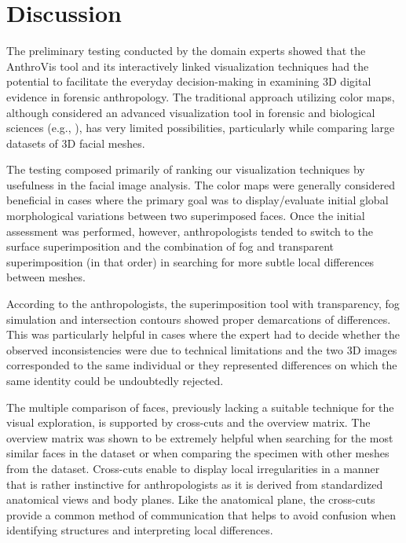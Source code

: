 \documentclass[final,5p,times]{elsarticle}
\begin{document}
\section{Discussion} \label{discussion}
The preliminary testing conducted by the domain experts showed that the AnthroVis tool and its interactively linked visualization techniques had the potential to facilitate the everyday decision-making in examining 3D digital evidence in forensic anthropology.
The traditional approach utilizing color maps, although considered an advanced visualization tool in forensic and biological sciences (e.g., \cite{urbanova2015testing}), has very limited possibilities, particularly while comparing large datasets of 3D facial meshes.

The testing composed primarily of ranking our visualization techniques by usefulness in the facial image analysis. 
The color maps were generally considered beneficial in cases where the primary goal was to display/evaluate initial global morphological variations between two superimposed faces. 
Once the initial assessment was performed, however, anthropologists tended to switch to the surface superimposition and the combination of fog and transparent superimposition (in that order) in searching for more subtle local differences between meshes. 

\begin{sloppypar}
According to the anthropologists, the superimposition tool with transparency, fog simulation and intersection contours showed proper demarcations of differences. This was particularly helpful in cases where the expert had to decide whether the observed inconsistencies were due to technical limitations and the two 3D images corresponded to the same individual or they represented differences on which the same identity could be undoubtedly rejected.
\end{sloppypar}
 
The multiple comparison of faces, previously lacking a suitable technique for the visual exploration, is supported by cross-cuts and the overview matrix. 
The overview matrix was shown to be extremely helpful when searching for the most similar faces in the dataset or when comparing the specimen with other meshes from the dataset. 
Cross-cuts enable to display local irregularities in a manner that is rather instinctive for anthropologists as it is derived from standardized anatomical views and body planes. 
Like the anatomical plane, the cross-cuts provide a common method of communication that helps to avoid confusion when identifying structures and interpreting local differences.
\end{document}
